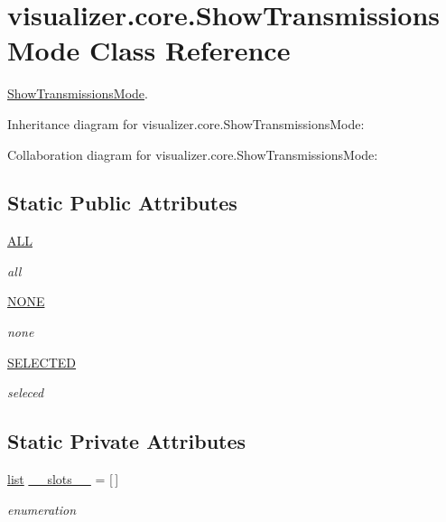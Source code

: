 \hypertarget{classvisualizer_1_1core_1_1ShowTransmissionsMode}{}\section{visualizer.\+core.\+Show\+Transmissions\+Mode Class Reference}
\label{classvisualizer_1_1core_1_1ShowTransmissionsMode}


\hyperlink{classvisualizer_1_1core_1_1ShowTransmissionsMode}{Show\+Transmissions\+Mode}.  




Inheritance diagram for visualizer.\+core.\+Show\+Transmissions\+Mode\+:


Collaboration diagram for visualizer.\+core.\+Show\+Transmissions\+Mode\+:
\subsection*{Static Public Attributes}
\begin{DoxyCompactItemize}
\item 
\hyperlink{classvisualizer_1_1core_1_1ShowTransmissionsMode_a8394a63d139f9bd62a3b04432e49a00f}{A\+LL}
\begin{DoxyCompactList}\small\item\em all \end{DoxyCompactList}\item 
\hyperlink{classvisualizer_1_1core_1_1ShowTransmissionsMode_a45dfbb41095952286a6d450d3370bac6}{N\+O\+NE}
\begin{DoxyCompactList}\small\item\em none \end{DoxyCompactList}\item 
\hyperlink{classvisualizer_1_1core_1_1ShowTransmissionsMode_ac64d9b2800dc198ba22450c507a0d31c}{S\+E\+L\+E\+C\+T\+ED}
\begin{DoxyCompactList}\small\item\em seleced \end{DoxyCompactList}\end{DoxyCompactItemize}
\subsection*{Static Private Attributes}
\begin{DoxyCompactItemize}
\item 
\hyperlink{openflow-interface_8h_afd9bcfa176617760671b67580f536fa7}{list} \hyperlink{classvisualizer_1_1core_1_1ShowTransmissionsMode_ab875d57db69579db3430e7e74678e257}{\+\_\+\+\_\+slots\+\_\+\+\_\+} = \mbox{[}$\,$\mbox{]}
\begin{DoxyCompactList}\small\item\em enumeration \end{DoxyCompactList}\end{DoxyCompactItemize}


